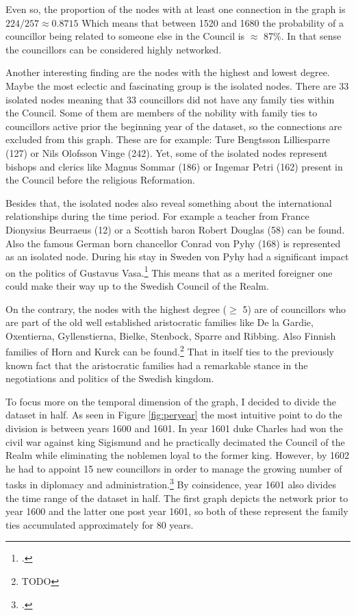 Even so, the proportion of the nodes with at least one connection in the graph is $224/257 \approx 0.8715$ Which means that between 1520 and 1680 the probability of a councillor being related to someone else in the Council is $\approx$ 87\%. In that sense the councillors can be considered highly networked.

Another interesting finding are the nodes with the highest and lowest degree. Maybe the most eclectic and fascinating group is the isolated nodes. There are 33 isolated nodes meaning that 33 councillors did not have any family ties within the Council. Some of them are members of the nobility with family ties to councillors active prior the beginning year of the dataset, so the connections are excluded from this graph. These are for example: Ture Bengtsson Lilliesparre (127) or Nils Olofsson Vinge (242). Yet, some of the isolated nodes represent bishops and clerics like Magnus Sommar (186) or Ingemar Petri (162) present in the Council before the religious Reformation. 

Besides that, the isolated nodes also reveal something about the international relationships during the time period. For example a teacher from France Dionysius Beurraeus (12) or a Scottish baron Robert Douglas (58) can be found. Also the famous German born chancellor Conrad von Pyhy (168) is represented as an isolated node. During his stay in Sweden von Pyhy had a significant impact on the politics of Gustavus Vasa.\footcite[p. 81-83.]{pSuurvalta} This means that as a merited foreigner one could make their way up to the Swedish Council of the Realm.

On the contrary, the nodes with the highest degree ($\geq$ 5) are of councillors who are part of the old well established aristocratic families like De la Gardie, Oxentierna, Gyllenstierna, Bielke, Stenbock, Sparre and Ribbing. Also Finnish families of Horn and Kurck can be found.\footnote{TODO} That in itself ties to the previously known fact that the aristocratic families had a remarkable stance in the negotiations and politics of the Swedish kingdom.

To focus more on the temporal dimension of the graph, I decided to divide the dataset in half. As seen in Figure \ref{fig:peryear} the most intuitive point to do the division is between years 1600 and 1601. In year 1601 duke Charles had won the civil war against king Sigismund and he practically decimated the Council of the Realm while eliminating the noblemen loyal to the former king. However, by 1602 he had to appoint 15 new councillors in order to manage the growing number of tasks in diplomacy and administration.\footcite[TODO]{pSuurvalta} By coinsidence, year 1601 also divides the time range of the dataset in half. The first graph depicts the network prior to year 1600 and the latter one post year 1601, so both of these represent the family ties accumulated approximately for 80 years.

